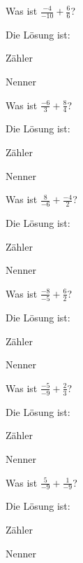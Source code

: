 \documentclass{ximera}
\begin{document}
\begin{shuffle}
\begin{question}
Was ist $\frac{-4}{-10} + \frac{6}{6}$?
\begin{solution}
Die Lösung ist:

Zähler 

Nenner 
\end{solution}
\end{question}


\begin{question}
Was ist $\frac{-6}{3} + \frac{8}{4}$?
\begin{solution}
Die Lösung ist:

Zähler 

Nenner 
\end{solution}
\end{question}


\begin{question}
Was ist $\frac{8}{-6} + \frac{-4}{2}$?
\begin{solution}
Die Lösung ist:

Zähler 

Nenner 
\end{solution}
\end{question}


\begin{question}
Was ist $\frac{-8}{-5} + \frac{6}{2}$?
\begin{solution}
Die Lösung ist:

Zähler 

Nenner 
\end{solution}
\end{question}


\begin{question}
Was ist $\frac{-5}{-9} + \frac{2}{3}$?
\begin{solution}
Die Lösung ist:

Zähler 

Nenner 
\end{solution}
\end{question}


\begin{question}
Was ist $\frac{5}{-9} + \frac{1}{-9}$?
\begin{solution}
Die Lösung ist:

Zähler 

Nenner 
\end{solution}
\end{question}



\end{shuffle}
\end{document}
